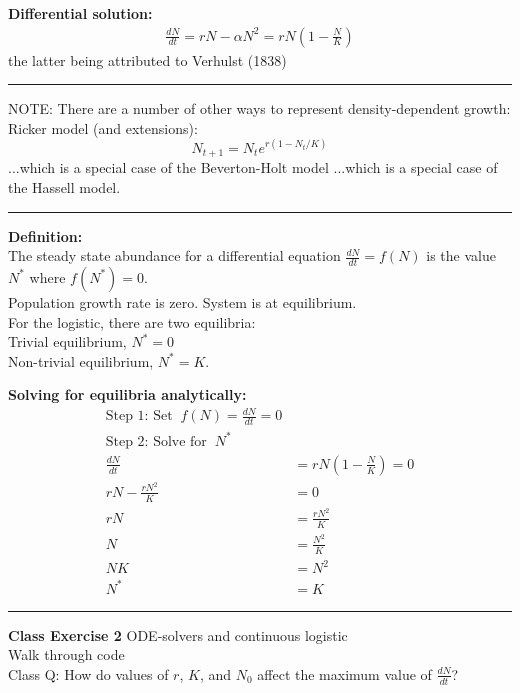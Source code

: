 \documentclass{article}
\newcommand{\note}[1]{\colorbox{gray!30}{#1}}
\newcommand{\ind}{\-\hspace{1cm}}
\begin{document}
\vspace{0.5cm}

\textbf{Differential solution:}
\begin{align*}
	\frac{dN}{dt}=rN-\alpha N^2=rN\left(1-\tfrac{N}{K}\right)
\end{align*}
the latter being attributed to Verhulst (1838)

\rule[0.5ex]{\linewidth}{1pt}

NOTE:  There are a number of other ways to represent density-dependent growth:\\
Ricker model (and extensions):
\begin{equation*}
	N_{t+1}=N_t e^{r(1-N_t /K)}
\end{equation*}
...which is a special case of the Beverton-Holt model
...which is a special case of the Hassell model.

\rule[0.5ex]{\linewidth}{1pt}

\pagebreak

\textbf{Definition:}\\
The steady state abundance for a differential equation $\frac{dN}{dt}=f(N)$ is the value $N^*$ where $f(N^*)=0$.\\
Population growth rate is zero.  System is at equilibrium.\\

For the logistic, there are two equilibria:\\
\ind Trivial equilibrium, $N^*=0$\\
\ind Non-trivial equilibrium, $N^*=K$.

\vspace{0.5cm}
\textbf{Solving for equilibria analytically:}
\begin{align*}
	\text{Step 1:  Set}\;\; f(N)=\frac{dN}{dt}=0&\\
	\text{Step 2:  Solve for}\;\;N^*&\\
	\frac{dN}{dt}&=rN\left(1-\frac{N}{K}\right)=0\\
	rN-\frac{rN^2}{K}&=0\\
	rN&=\frac{rN^2}{K}\\
	N&=\frac{N^2}{K}\\
	NK&=N^2\\
	N^*&=K
\end{align*}

\rule[0.5ex]{\linewidth}{1pt}

\textbf{Class Exercise 2} ODE-solvers and continuous logistic\\
\note{Walk through code}\\
\note{Class Q:} How do values of $r$, $K$, and $N_0$ affect the maximum value of $\frac{dN}{dt}$?
\end{document}
